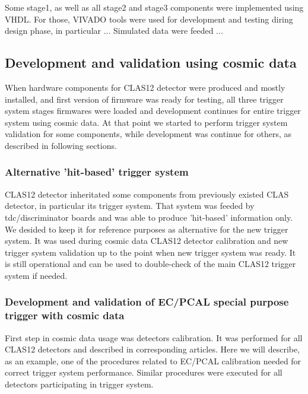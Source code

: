 Some stage1, as well as all stage2 and stage3 components were implemented using VHDL. For those, VIVADO tools were used for development and testing diring design phase, in particular ...
Simulated data were feeded ...

\subsection{Development and validation using cosmic data}

When hardware components for CLAS12 detector were produced and mostly installed, and first version of firmware was ready for testing, all three trigger system stages firmwares were loaded and development continues for entire trigger system using cosmic data. At that point we started to perform trigger system validation for some components, while development was continue for others, as described in following sections.

\subsubsection{Alternative 'hit-based' trigger system}

CLAS12 detector inheritated some components from previously existed CLAS detector, in particular its trigger system. That system was feeded by tdc/discriminator boards and was able to produce 'hit-based' information only. We desided to keep it for reference purposes as alternative for the new trigger system. It was used during cosmic data CLAS12 detector calibration and new trigger system validation up to the point when new trigger system was ready. It is still operational and can be used to double-check of the main CLAS12 trigger system if needed.

\subsubsection{Development and validation of EC/PCAL special purpose trigger with cosmic data}

First step in cosmic data usage was detectors calibration. It was performed for all CLAS12 detectors and described in corresponding articles. Here we will describe, as an example, one of the procedures related to EC/PCAL calibration needed for correct trigger system performance. Similar procedures were executed for all detectors participating in trigger system.

